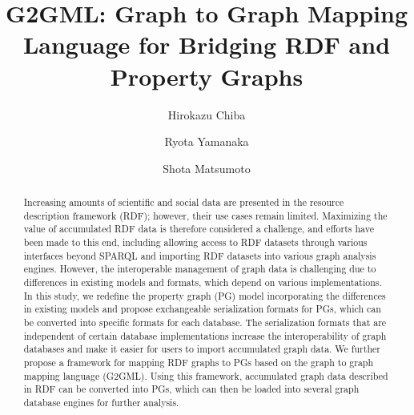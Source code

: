 \documentclass[runningheads]{llncs}
\begin{document}
\newtheorem{defi}[theorem]{Definition}
\newtheorem*{prel}{Preliminaries}
%
\title{G2GML: Graph to Graph Mapping Language for Bridging RDF and Property Graphs} 
%
%
\author{Hirokazu Chiba \and Ryota Yamanaka \and Shota Matsumoto}
%
%
%
\maketitle              %
%
\begin{abstract}
Increasing amounts of scientific and social data are presented in the resource description framework (RDF); however, their use cases remain limited. Maximizing the value of accumulated RDF data is therefore considered a challenge, and efforts have been made to this end, including allowing access to RDF datasets through various interfaces beyond SPARQL and importing RDF datasets into various graph analysis engines.  
However, the interoperable management of graph data is challenging due to differences in existing models and formats, which depend on various implementations. In this study, we redefine the property graph (PG) model incorporating the differences in existing models and propose exchangeable serialization formats for PGs, which can be converted into specific formats for each database. 
The serialization formats that are independent of certain database implementations increase the interoperability of graph databases and make it easier for users to import accumulated graph data.
We further propose a framework for mapping RDF graphs to PGs based on the graph to graph mapping language (G2GML). Using this framework, accumulated graph data described in RDF can be converted into PGs, which can then be loaded into several graph database engines for further analysis. 

\end{abstract}
\end{document}
